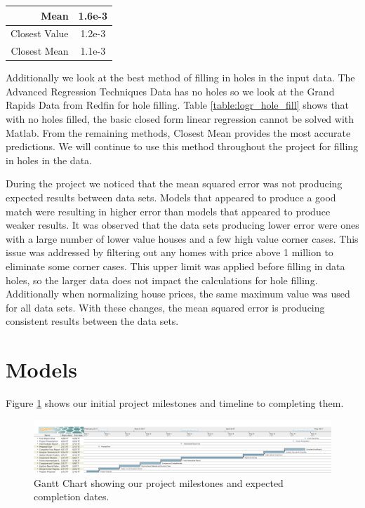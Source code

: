 \documentclass[10pt]{article}
\begin{document}
\begin{multicols}{2}
{\begin{tabular}{r|c}
				\hline
				\small{Mean} & \small{1.6e-3} \\
				\hline
				\small{Closest Value} & \small{1.2e-3} \\
				\hline
				\small{Closest Mean} & \small{1.1e-3} \\
				\hline
			\end{tabular}
			\label{table:linr_hole_fill}        
		\setlength{\parindent}{15pt} }
                \par
                Additionally we look at the best method of filling in holes in the input data. The Advanced Regression Techniques Data has no holes so we look at the Grand Rapids Data from Redfin for hole filling. Table \ref{table:logr_hole_fill} shows that with no holes filled, the basic closed form linear regression cannot be solved with Matlab. From the remaining methods, Closest Mean provides the most accurate predictions. We will continue to use this method throughout the project for filling in holes in the data.
                \par
                During the project we noticed that the mean squared error was not producing expected results between data sets. Models that appeared to produce a good match were resulting in higher error than models that appeared to produce weaker results. It was observed that the data sets producing lower error were ones with a large number of lower value houses and a few high value corner cases. This issue was addressed by filtering out any homes with price above 1 million to eliminate some corner cases. This upper limit was applied before filling in data holes, so the larger data does not impact the calculations for hole filling. Additionally when normalizing house prices, the same maximum value was used for all data sets. With these changes, the mean squared error is producing consistent results between the data sets.
 		\section{Models}
		Figure \ref{fig:ganttchart} shows our initial project milestones and timeline to completing them.
	\end{multicols}
	\begin{figure}[h]
	    \centering
	    \includegraphics[width=\textwidth]{Schedule/ProjectSchedule.png}
	    \caption{Gantt Chart showing  our project milestones and expected completion dates.}
	    \label{fig:ganttchart}
	\end{figure}
\end{document}
